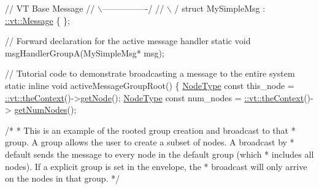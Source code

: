 \begin{DoxyCodeInclude}
\textcolor{comment}{//                  VT Base Message}
\textcolor{comment}{//                 \(\backslash\)----------------/}
\textcolor{comment}{//                  \(\backslash\)              /}
\textcolor{keyword}{struct }MySimpleMsg : \hyperlink{structvt_1_1messaging_1_1_active_msg}{::vt::Message} \{ \};

\textcolor{comment}{// Forward declaration for the active message handler}
\textcolor{keyword}{static} \textcolor{keywordtype}{void} msgHandlerGroupA(MySimpleMsg* msg);

\textcolor{comment}{// Tutorial code to demonstrate broadcasting a message to the entire system}
\textcolor{keyword}{static} \textcolor{keyword}{inline} \textcolor{keywordtype}{void} activeMessageGroupRoot() \{
  \hyperlink{namespacevt_a866da9d0efc19c0a1ce79e9e492f47e2}{NodeType} \textcolor{keyword}{const} this\_node = \hyperlink{namespacevt_a26551fe0e6e6a1371111df5b12c7e92c}{::vt::theContext}()->\hyperlink{structvt_1_1ctx_1_1_context_a0d52c263ce8516546a67443d9a86fa5f}{getNode}();
  \hyperlink{namespacevt_a866da9d0efc19c0a1ce79e9e492f47e2}{NodeType} \textcolor{keyword}{const} num\_nodes = \hyperlink{namespacevt_a26551fe0e6e6a1371111df5b12c7e92c}{::vt::theContext}()->
      \hyperlink{structvt_1_1ctx_1_1_context_a7f41071aadf6d5fa9e1b6c703c5ff19d}{getNumNodes}();

  \textcolor{comment}{/*}
\textcolor{comment}{   * This is an example of the rooted group creation and broadcast to that}
\textcolor{comment}{   * group. A group allows the user to create a subset of nodes. A broadcast by}
\textcolor{comment}{   * default sends the message to every node in the default group (which}
\textcolor{comment}{   * includes all nodes). If a explicit group is set in the envelope, the}
\textcolor{comment}{   * broadcast will only arrive on the nodes in that group.}
\textcolor{comment}{   */}


\end{DoxyCodeInclude}

